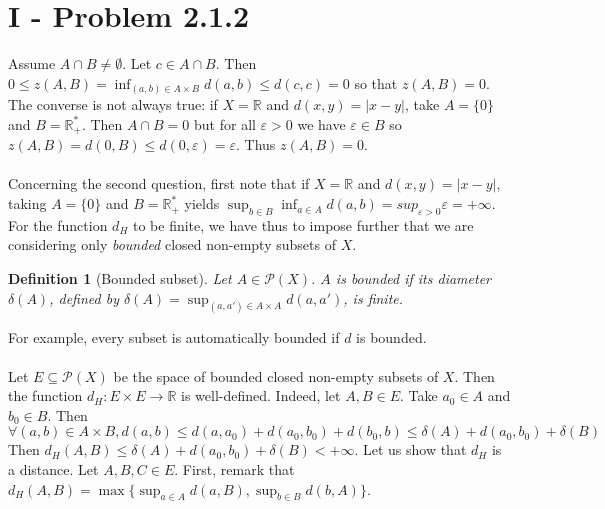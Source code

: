 \documentclass[11pt,a4paper]{article}
\newtheorem{defi}{Definition}
\newcommand{\il}{\textit}
\newcommand{\R}{\mathbb{R}}
\newcommand{\1}{\mathbbm{1}}
\renewcommand{\P}{\mathcal{P}}
\begin{document}
\section*{I - Problem 2.1.2}

Assume $A \cap B \neq \emptyset$. Let $c \in A \cap B$. Then $0 \leq z(A,B) = \inf_{(a,b) \in A \times B} d(a,b) \leq d(c,c) = 0$ so that $z(A,B) = 0$. The converse is not always true: if $X = \R$ and $d(x,y) = |x-y|$, take $A = \{0\}$ and $B = \R_+^*$. Then $A \cap B = 0$ but for all $\varepsilon > 0$ we have $\varepsilon \in B$ so $z(A,B) = d(0,B) \leq d(0,\varepsilon) = \varepsilon$. Thus $z(A,B) = 0$.\\\\
Concerning the second question, first note that if $X = \R$ and $d(x,y) = |x-y|$, taking $A = \{0\}$ and $B = \R_+^*$ yields $\sup_{b \in B} \inf_{a\in A} d(a,b) = sup_{\varepsilon > 0} \varepsilon = +\infty$. For the function $d_H$ to be finite, we have thus to impose further that we are considering only \il{bounded} closed non-empty subsets of $X$. 
\begin{defi}[Bounded subset] Let $A \in \P(X)$. $A$ is bounded if its diameter $\delta(A)$, defined by $\delta(A) = \sup_{(a,a') \in A \times A} d(a,a')$, is finite.
\end{defi}
For example, every subset is automatically bounded if $d$ is bounded.\\\\
Let $E \subseteq \P(X)$ be the space of bounded closed non-empty subsets of $X$. Then the function $d_H : E \times E \to \R$ is well-defined. Indeed, let $A,B \in E$. Take $a_0 \in A$ and $b_0 \in B$. Then
\[ \forall (a,b) \in A \times B,  d(a,b) \leq d(a,a_0) +  d(a_0,b_0) + d(b_0,b) \leq \delta(A) + d(a_0,b_0) + \delta(B) \]
Then $d_H(A,B) \leq \delta(A) + d(a_0,b_0) + \delta(B) < +\infty$. Let us show that $d_H$ is a distance.
Let $A,B,C \in E$. First, remark that $d_H(A,B) = \max\{ \sup_{a \in A} d(a,B) , \sup_{b \in B} d(b,A) \}$.
\end{document}
